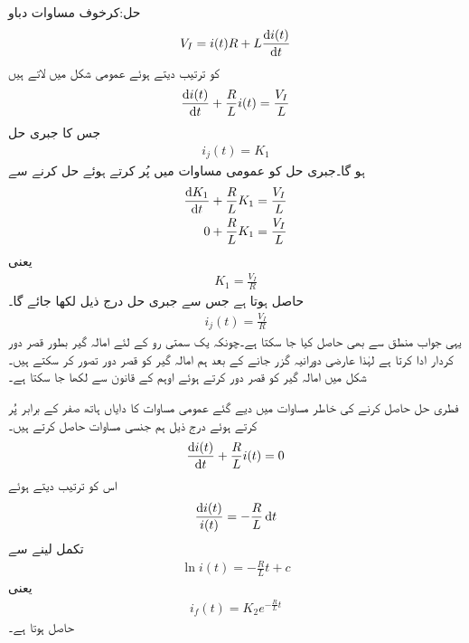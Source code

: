 حل:کرخوف مساوات دباو
\begin{align*}
V_I=i(t)R+L\frac{\dif i(t)}{\dif t}
\end{align*}
کو ترتیب دیتے ہوئے عمومی شکل میں لاتے ہیں
\begin{align}\label{مساوات_عارضی_امالہ_گیر_عمومی_الف}
\frac{\dif i(t)}{\dif t}+\frac{R}{L} i(t)=\frac{V_I}{L}
\end{align}
جس کا جبری حل
\begin{align*}
i_j(t)=K_1
\end{align*}
ہو گا۔جبری حل کو عمومی مساوات میں پُر کرتے ہوئے حل کرنے سے
\begin{align*}
\frac{\dif K_1}{\dif t}+\frac{R}{L} K_1&=\frac{V_I}{L}\\
0+\frac{R}{L} K_1&=\frac{V_I}{L}
\end{align*}
یعنی
\begin{align*}
K_1=\frac{V_I}{R}
\end{align*}
حاصل ہوتا ہے جس سے جبری حل درج ذیل لکھا جائے گا۔
\begin{align*}
i_j(t)=\frac{V_I}{R}
\end{align*}
یہی جواب منطق سے بھی حاصل کیا جا سکتا ہے۔چونکہ  یک سمتی رو کے لئے امالہ گیر بطور قصر دور کردار ادا کرتا ہے لہٰذا عارضی دورانیہ گزر جانے کے بعد ہم امالہ گیر کو قصر دور تصور کر سکتے ہیں۔شکل  میں امالہ گیر کو قصر دور کرتے ہوئے اوہم کے قانون سے  لکھا جا سکتا ہے۔

فطری حل حاصل کرنے کی خاطر مساوات  میں دیے گئے عمومی مساوات کا دایاں ہاتھ صفر کے برابر پُر کرتے ہوئے درج ذیل ہم جنسی مساوات حاصل کرتے ہیں۔
\begin{align*}
\frac{\dif i(t)}{\dif t}+\frac{R}{L} i(t)=0
\end{align*}
اس کو ترتیب دیتے ہوئے
\begin{align*}
\frac{\dif i(t)}{i(t)}=-\frac{R}{L} \dif t
\end{align*}
تکمل لینے سے
\begin{align*}
\ln i(t)=-\frac{R}{L}t +c
\end{align*}
یعنی
\begin{align*}
i_f(t)=K_2e^{-\frac{R}{L}t}
\end{align*}
حاصل ہوتا ہے۔

